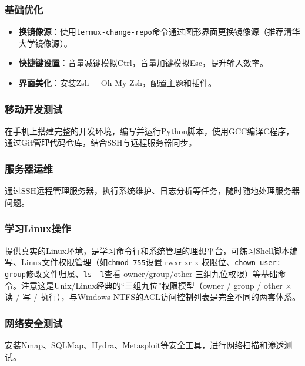 \subsubsection*{基础优化}

\begin{itemize}
  \item \textbf{换镜像源}：使用\texttt{termux-\allowbreak change-\allowbreak repo}命令通过图形界面更换镜像源（推荐清华大学镜像源）。
  \item \textbf{快捷键设置}：音量减键模拟Ctrl，音量加键模拟Esc，提升输入效率。
  \item \textbf{界面美化}：安装Zsh + Oh My Zsh，配置主题和插件。
\end{itemize}


\subsubsection*{移动开发测试}

在手机上搭建完整的开发环境，编写并运行Python脚本，使用GCC编译C程序，通过Git管理代码仓库，结合SSH与远程服务器同步。

\subsubsection*{服务器运维}

通过SSH远程管理服务器，执行系统维护、日志分析等任务，随时随地处理服务器问题。

\subsubsection*{学习Linux操作}

提供真实的Linux环境，是学习命令行和系统管理的理想平台，可练习Shell脚本编写、Linux文件权限管理（如\texttt{chmod 755}设置 rwxr-xr-x 权限位、\texttt{chown user: group}修改文件归属、\texttt{ls -\allowbreak l}查看 owner/group/other 三组九位权限）等基础命令。注意这是Unix/Linux经典的“三组九位”权限模型（owner / group / other × 读 / 写 / 执行），与Windows NTFS的ACL访问控制列表是完全不同的两套体系。

\subsubsection*{网络安全测试}

安装Nmap、SQLMap、Hydra、Metasploit等安全工具，进行网络扫描和渗透测试。


